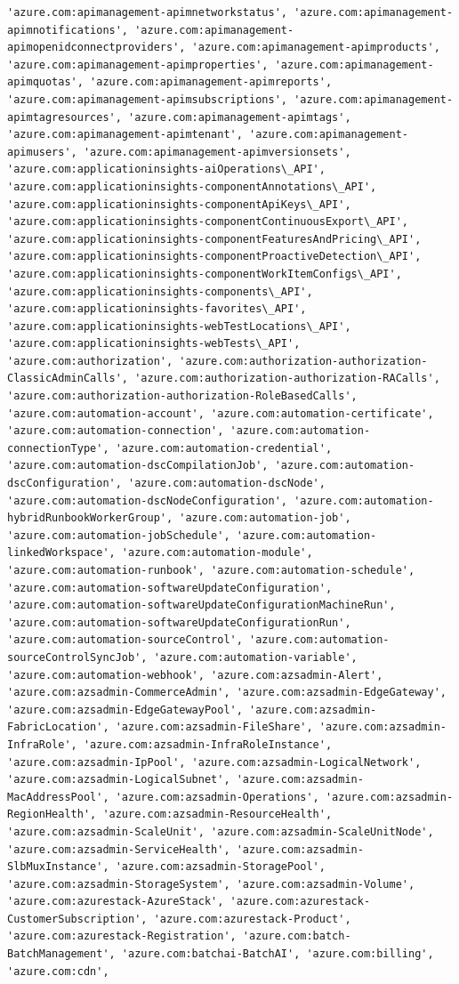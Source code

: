 \documentclass[11pt]{article}
\begin{document}
\begin{Verbatim}[commandchars=\\\{\}]
'azure.com:apimanagement-apimnetworkstatus', 'azure.com:apimanagement-apimnotifications', 'azure.com:apimanagement-apimopenidconnectproviders', 'azure.com:apimanagement-apimproducts', 'azure.com:apimanagement-apimproperties', 'azure.com:apimanagement-apimquotas', 'azure.com:apimanagement-apimreports', 'azure.com:apimanagement-apimsubscriptions', 'azure.com:apimanagement-apimtagresources', 'azure.com:apimanagement-apimtags', 'azure.com:apimanagement-apimtenant', 'azure.com:apimanagement-apimusers', 'azure.com:apimanagement-apimversionsets', 'azure.com:applicationinsights-aiOperations\_API', 'azure.com:applicationinsights-componentAnnotations\_API', 'azure.com:applicationinsights-componentApiKeys\_API', 'azure.com:applicationinsights-componentContinuousExport\_API', 'azure.com:applicationinsights-componentFeaturesAndPricing\_API', 'azure.com:applicationinsights-componentProactiveDetection\_API', 'azure.com:applicationinsights-componentWorkItemConfigs\_API', 'azure.com:applicationinsights-components\_API', 'azure.com:applicationinsights-favorites\_API', 'azure.com:applicationinsights-webTestLocations\_API', 'azure.com:applicationinsights-webTests\_API', 'azure.com:authorization', 'azure.com:authorization-authorization-ClassicAdminCalls', 'azure.com:authorization-authorization-RACalls', 'azure.com:authorization-authorization-RoleBasedCalls', 'azure.com:automation-account', 'azure.com:automation-certificate', 'azure.com:automation-connection', 'azure.com:automation-connectionType', 'azure.com:automation-credential', 'azure.com:automation-dscCompilationJob', 'azure.com:automation-dscConfiguration', 'azure.com:automation-dscNode', 'azure.com:automation-dscNodeConfiguration', 'azure.com:automation-hybridRunbookWorkerGroup', 'azure.com:automation-job', 'azure.com:automation-jobSchedule', 'azure.com:automation-linkedWorkspace', 'azure.com:automation-module', 'azure.com:automation-runbook', 'azure.com:automation-schedule', 'azure.com:automation-softwareUpdateConfiguration', 'azure.com:automation-softwareUpdateConfigurationMachineRun', 'azure.com:automation-softwareUpdateConfigurationRun', 'azure.com:automation-sourceControl', 'azure.com:automation-sourceControlSyncJob', 'azure.com:automation-variable', 'azure.com:automation-webhook', 'azure.com:azsadmin-Alert', 'azure.com:azsadmin-CommerceAdmin', 'azure.com:azsadmin-EdgeGateway', 'azure.com:azsadmin-EdgeGatewayPool', 'azure.com:azsadmin-FabricLocation', 'azure.com:azsadmin-FileShare', 'azure.com:azsadmin-InfraRole', 'azure.com:azsadmin-InfraRoleInstance', 'azure.com:azsadmin-IpPool', 'azure.com:azsadmin-LogicalNetwork', 'azure.com:azsadmin-LogicalSubnet', 'azure.com:azsadmin-MacAddressPool', 'azure.com:azsadmin-Operations', 'azure.com:azsadmin-RegionHealth', 'azure.com:azsadmin-ResourceHealth', 'azure.com:azsadmin-ScaleUnit', 'azure.com:azsadmin-ScaleUnitNode', 'azure.com:azsadmin-ServiceHealth', 'azure.com:azsadmin-SlbMuxInstance', 'azure.com:azsadmin-StoragePool', 'azure.com:azsadmin-StorageSystem', 'azure.com:azsadmin-Volume', 'azure.com:azurestack-AzureStack', 'azure.com:azurestack-CustomerSubscription', 'azure.com:azurestack-Product', 'azure.com:azurestack-Registration', 'azure.com:batch-BatchManagement', 'azure.com:batchai-BatchAI', 'azure.com:billing', 'azure.com:cdn', 
\end{Verbatim}
\end{document}
